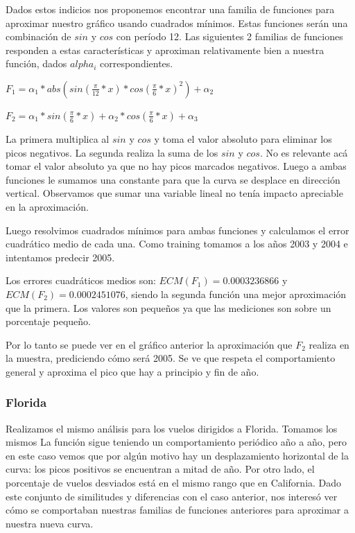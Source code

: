 Dados estos indicios nos proponemos encontrar una familia de funciones para aproximar nuestro gr\'afico usando cuadrados m\'inimos. Estas funciones ser\'an una combinaci\'on de $sin$ y $cos$ con per\'iodo 12. Las siguientes 2 familias de funciones responden a estas caracter\'isticas y aproximan relativamente bien a nuestra funci\'on, dados $alpha_i$ correspondientes.


$F_1 = \alpha_1 * abs(sin(\frac{\pi}{12}*x) * cos(\frac{\pi}{6}*x)^2) + \alpha_2$

$F_2 = \alpha_1 * sin(\frac{\pi}{6}*x) + \alpha_2 * cos(\frac{\pi}{6}*x) + \alpha_3$


La primera multiplica al $sin$ y $cos$ y toma el valor absoluto para eliminar los picos negativos. La segunda realiza la suma de los $sin$ y $cos$. No es relevante ac\'a tomar el valor absoluto ya que no hay picos marcados negativos. Luego a ambas funciones le sumamos una constante para que la curva se desplace en direcci\'on vertical. Observamos que sumar una variable lineal no ten\'ia impacto apreciable en la aproximaci\'on. 

Luego resolvimos cuadrados m\'inimos para ambas funciones y calculamos el error cuadr\'atico medio de cada una. Como training tomamos a los años 2003 y 2004 e intentamos predecir 2005.

Los errores cuadr\'aticos medios son: $ECM(F_1) = 0.0003236866$ y $ECM(F_2) = 0.0002451076$, siendo la segunda funci\'on una mejor aproximaci\'on que la primera. Los valores son pequeños ya que las mediciones son sobre un porcentaje pequeño.

Por lo tanto se puede ver en el gr\'afico anterior la aproximaci\'on que $F_2$ realiza en la muestra, prediciendo c\'omo ser\'a 2005. Se ve que respeta el comportamiento general y aproxima el pico que hay a principio y fin de año.

\subsubsection{Florida}

Realizamos el mismo an\'alisis para los vuelos dirigidos a Florida. Tomamos los mismos 
La funci\'on sigue teniendo un comportamiento peri\'odico año a año, pero en este caso vemos que por alg\'un motivo hay un desplazamiento horizontal de la curva: los picos positivos se encuentran a mitad de año.
Por otro lado, el porcentaje de vuelos desviados est\'a en el mismo rango que en California.
Dado este conjunto de similitudes y diferencias con el caso anterior, nos interes\'o ver c\'omo se comportaban nuestras familias de funciones anteriores para aproximar a nuestra nueva curva.

